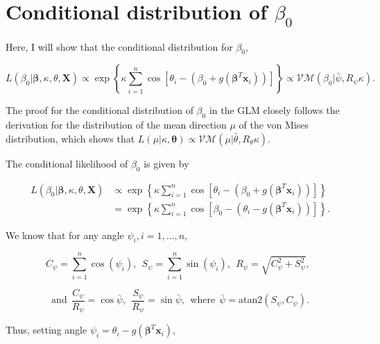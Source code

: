 \documentclass{article}\usepackage[]{graphicx}\usepackage[]{color}
\begin{document}
\newpage


\section{Conditional distribution of $\beta_0$} \label{beta0}

Here, I will show that the conditional distribution for $\beta_0$,

$$ L(\beta_0 \vert \boldsymbol\beta, \kappa, \theta, \boldsymbol{X}) \propto \exp \left\lbrace \kappa \sum_{i=1}^n \cos \left[ \theta_i - (\beta_0 + g(\boldsymbol\beta^T \boldsymbol{x}_i)) \right]  \right\rbrace \propto \mathcal{VM}(\beta_0 \vert \bar\psi, R_{\psi}\kappa). $$

The proof for the conditional distribution of $\beta_0$ in the GLM closely follows the derivation for the distribution of the mean direction $\mu$ of the von Mises distribution, which shows that $L(\mu \vert \kappa, \boldsymbol\theta) \propto \mathcal{VM}(\mu \vert \bar\theta, R_{\theta} \kappa)$.

The conditional likelihood of $\beta_0$ is given by

\begin{align*}
L(\beta_0 \vert \boldsymbol\beta, \kappa, \theta, \boldsymbol{X}) & \propto \exp \left\lbrace \kappa \sum_{i=1}^n \cos \left[ \theta_i - (\beta_0 + g(\boldsymbol\beta^T \boldsymbol{x}_i)) \right] \right\rbrace \\
& = \exp \left\lbrace \kappa \sum_{i=1}^n \cos \left[ \beta_0 - (\theta_i - g(\boldsymbol\beta^T \boldsymbol{x}_i)) \right]  \right\rbrace.
\end{align*}

We know that for any angle $\psi_i, i = 1, \dots, n$,

$$ C_{\psi} = \sum_{i=1}^n \cos(\psi_i), ~~ S_{\psi} = \sum_{i=1}^n \sin(\psi_i), ~~ R_{\psi} = \sqrt{C_{\psi}^2 + S_{\psi}^2}, ~~ $$

$$ \text{and} ~~ \frac{C_{\psi}}{R_{\psi}} = \cos \bar\psi, ~~ \frac{S_{\psi}}{R_{\psi}} = \sin \bar\psi, ~~ \text{where} ~~ \bar\psi = \text{atan2}(S_{\psi}, C_{\psi}). $$

Thus, setting angle $\psi_i = \theta_i - g(\boldsymbol\beta^T \boldsymbol{x}_i)$,
\end{document}
